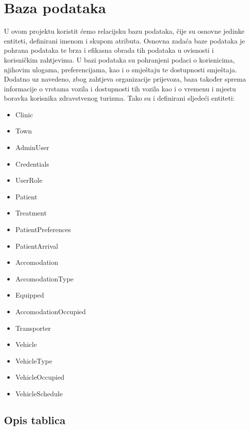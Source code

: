 				
		\section{Baza podataka}
			
			
			U ovom projektu koristit ćemo relacijsku bazu podataka, čije su osnovne jedinke entiteti, definirani imenom i skupom atributa. Osnovna zadaća baze podataka je pohrana podataka te brza i efikasna obrada tih podataka u ovisnosti i korisničkim zahtjevima. U bazi podataka su pohranjeni podaci o korisnicima, njihovim ulogama, preferencijama, kao i o smještaju te dostupnosti smještaja. Dodatno uz navedeno, zbog zahtjeva organizacije prijevoza, baza također sprema informacije o vrstama vozila i dostupnosti tih vozila kao i o vremenu i mjestu boravka korisnika zdravstvenog turizma. Tako su i definirani sljedeći entiteti:
			\begin{itemize}
				\item Clinic
				\item Town
				\item AdminUser
				\item Credentials
				\item UserRole
				\item Patient
				\item Treatment
				\item PatientPreferences
				\item PatientArrival
				\item Accomodation
				\item AccomodationType
				\item Equipped
				\item AccomodationOccupied
				\item Transporter
				\item Vehicle
				\item VehicleType
				\item VehicleOccupied
				\item VehicleSchedule
			\end{itemize}
		
			\subsection{Opis tablica}
			
